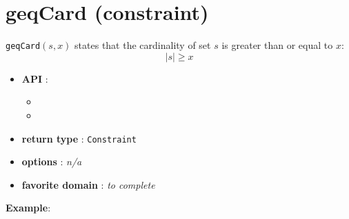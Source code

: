 \label{geqcard}
\hypertarget{geqcard}{}

\section{geqCard (constraint)}\label{geqcard:geqcardconstraint}\hypertarget{geqcard:geqcardconstraint}{}
\begin{notedef}
  \texttt{geqCard}$(s,x)$ states that the cardinality of set $s$ is greater than or equal to $x$:
$$|s| \ge x$$
\end{notedef}

\begin{itemize}
	\item \textbf{API} :
	\begin{itemize}
		\item {}
		\item {}
	\end{itemize}
	\item \textbf{return type} : \texttt{Constraint}
	\item \textbf{options} : \emph{n/a}
	\item \textbf{favorite domain} : \emph{to complete}
\end{itemize}

\textbf{Example}:

